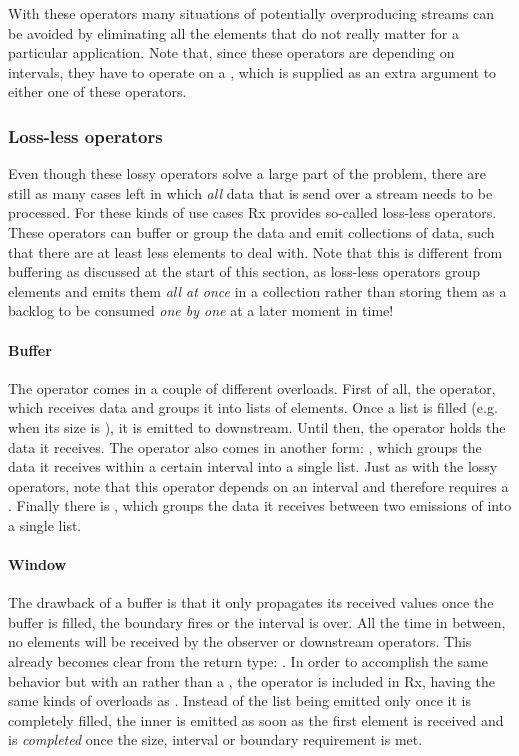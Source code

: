With these operators many situations of potentially overproducing streams can be avoided by eliminating all the elements that do not really matter for a particular application. Note that, since these operators are depending on intervals, they have to operate on a \sch, which is supplied as an extra argument to either one of these operators.

\subsubsection{Loss-less operators}
Even though these lossy operators solve a large part of the problem, there are still as many cases left in which \emph{all} data that is send over a stream needs to be processed. For these kinds of use cases Rx provides so-called loss-less operators. These operators can buffer or group the data and emit collections of data, such that there are at least less elements to deal with. Note that this is different from buffering as discussed at the start of this section, as loss-less operators group elements and emits them \emph{all at once} in a collection rather than storing them as a backlog to be consumed \emph{one by one} at a later moment in time!

\paragraph{Buffer} The  operator comes in a couple of different overloads. First of all, the  operator, which receives data and groups it into lists of  elements. Once a list is filled (e.g. when its size is ), it is emitted to downstream. Until then, the operator holds the data it receives. The  operator also comes in another form: , which groups the data it receives within a certain interval into a single list. Just as with the lossy operators, note that this operator depends on an interval and therefore requires a \sch. Finally there is , which groups the data it receives between two emissions of  into a single list.

\paragraph{Window} The drawback of a buffer is that it only propagates its received values once the buffer is filled, the boundary \obs fires or the interval is over. All the time in between, no elements will be received by the observer or downstream operators. This already becomes clear from the return type: . In order to accomplish the same behavior but with an \obs rather than a , the  operator is included in Rx, having the same kinds of overloads as . Instead of the list being emitted only once it is completely filled, the inner \obs is emitted as soon as the first element is received and is \emph{completed} once the size, interval or boundary requirement is met.

